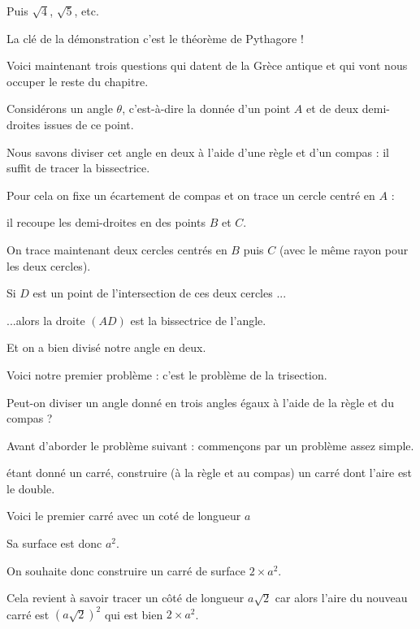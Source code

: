 \change
Puis $\sqrt 4$, $\sqrt5$, etc.

La clé de la démonstration c'est le théorème de Pythagore !


\diapo

Voici maintenant trois questions qui datent de la Grèce antique 
et qui vont nous occuper le reste du chapitre.

Considérons un angle $\theta$, c'est-à-dire la donnée d'un point $A$ et de deux demi-droites 
issues de ce point.

\change
Nous savons diviser cet angle en deux à l'aide d'une règle et d'un compas :
il suffit de tracer la bissectrice. 

\change
Pour cela on fixe un écartement de compas et on trace un cercle
centré en $A$ : 

\change
il recoupe les demi-droites en des points $B$ et $C$. 

\change
On trace maintenant deux cercles centrés en $B$ puis $C$ (avec le même rayon pour les deux cercles). 


Si $D$ est un point de l'intersection de ces
deux cercles ...

\change
...alors la droite $(AD)$ est la bissectrice de l'angle.

\change
Et on a bien divisé notre angle en deux.


\diapo

Voici notre premier problème : c'est le problème de la trisection.

Peut-on diviser un angle donné en trois 
angles égaux à l'aide de la règle et du compas ?




\diapo

Avant d'aborder le problème suivant : commençons par un problème assez simple.

étant donné un carré, construire (à la règle et au compas)
un carré dont l'aire est le double. 

\change
Voici le premier carré avec  un coté de longueur $a$

Sa surface est donc $a^2$.

On souhaite donc construire un carré de surface $2 \times a^2$.

\change
Cela revient à savoir tracer un côté de longueur
$a\sqrt2$ car alors l'aire du nouveau carré est $(a\sqrt2)^2$ qui est bien $2 \times a^2$.


